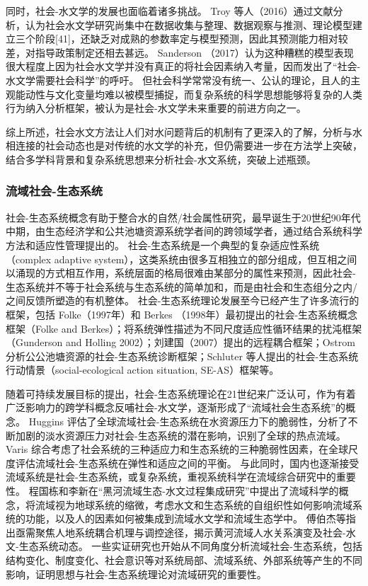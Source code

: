 同时，社会-水文学的发展也面临着诸多挑战。
Troy 等人（2016）通过文献分析，认为社会水文学研究尚集中在数据收集与整理、数据观察与推测、理论模型建立三个阶段[41]，还缺乏对成熟的参数率定与模型预测，因此其预测能力相对较差，对指导政策制定还相去甚远。  %
Sanderson （2017）\cite{sanderson2017}认为这种糟糕的模型表现很大程度上因为社会水文学并没有真正的将社会因素纳入考量，因而发出了“社会-水文学需要社会科学”的呼吁。
但社会科学常常没有统一、公认的理论，且人的主观能动性与文化变量均难以被模型捕捉，而复杂系统的科学思想能够将复杂的人类行为纳入分析框架，被认为是社会-水文学未来重要的前进方向之一\cite{ahlstrom2021}。

综上所述，社会水文方法让人们对水问题背后的机制有了更深入的了解，分析与水相连接的社会动态也是对传统的水文学的补充，但仍需要进一步在方法学上突破，结合多学科背景和复杂系统思想来分析社会-水文系统，突破上述瓶颈。


\subsubsection*{流域社会-生态系统}

社会-生态系统概念有助于整合水的自然/社会属性研究\cite{fowler2022}，最早诞生于20世纪90年代中期，由生态经济学和公共池塘资源系统学者间的跨领域学者，通过结合系统科学方法和适应性管理提出的\cite{biggs2021}。
社会-生态系统是一个典型的复杂适应性系统（complex adaptive system），这类系统由很多互相独立的部分组成，但互相之间以涌现的方式相互作用，系统层面的格局很难由某部分的属性来预测，因此社会-生态系统并不等于社会系统与生态系统的简单加和，而是由社会和生态组分之内/之间反馈所塑造的有机整体。 %
社会-生态系统理论发展至今已经产生了许多流行的框架，包括 Folke（1997年）和 Berkes （1998年）最初提出的社会-生态系统概念框架（Folke and Berkes）；将系统弹性描述为不同尺度适应性循环结果的扰沌框架（Gunderson and Holling 2002）；刘建国（2007）提出的远程耦合框架；Ostrom 分析公公池塘资源的社会-生态系统诊断框架；Schluter 等人提出的社会-生态系统行动情景（social-ecological action situation, SE-AS）框架等。

随着可持续发展目标的提出，社会-生态系统理论在21世纪来广泛认可，作为有着广泛影响力的跨学科概念反哺社会-水文学，逐渐形成了“流域社会生态系统”的概念。
Huggins 评估了全球流域社会-生态系统在水资源压力下的脆弱性，分析了不断加剧的淡水资源压力对社会-生态系统的潜在影响，识别了全球的热点流域\cite{huggins2022}。
Varis 综合考虑了社会系统的三种适应力和生态系统的三种脆弱性因素，在全球尺度评估流域社会-生态系统在弹性和适应之间的平衡\cite{varis2019}。
与此同时，国内也逐渐接受流域系统是社会-生态系统，或复杂系统，重视系统科学在流域综合研究中的重要性。
程国栋和李新\cite{cheng2015}在“黑河流域生态-水文过程集成研究”中提出了流域科学的概念，将流域视为地球系统的缩微，考虑水文和生态系统的自组织性如何影响流域系统的功能，以及人的因素如何被集成到流域水文学和流域生态学中。
傅伯杰\cite{fu2017a}等指出亟需聚焦人地系统耦合机理与调控途径，揭示黄河流域人水关系演变及社会-水文-生态系统动态\cite{fu2021a}。
一些实证研究也开始从不同角度分析流域社会-生态系统，包括结构变化\cite{song2022}、制度变化\cite{wang2019d}、社会意识\cite{liu2023}等对系统局部、流域系统、外部系统等产生的不同影响，证明思想与社会-生态系统理论对流域研究的重要性。

